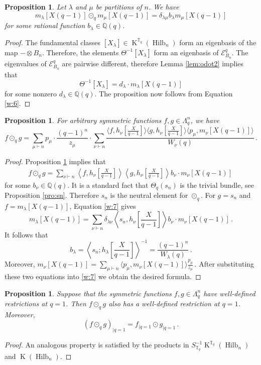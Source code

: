 \documentclass[12pt,a4paper]{amsart}
\theoremstyle{plain}
\newtheorem{pro}[tw]{Proposition}
\theoremstyle{definition}
\theoremstyle{remark}
\newcommand{\Hilb}[1]{\operatorname{Hilb}_{{#1}}}
\newcommand{\QQ}{\mathbb{Q}}
\newcommand{\Tq}{{\mathbb{T}_q}}
\newcommand{\E}{\mathcal{E}}
\DeclareMathOperator{\KTh}{K}
\begin{document}
\begin{pro} \label{pro:odot2}
	Let $\lambda$ and $\mu$ be partitions of $n$. We have
	$$
	m_\lambda[X(q-1)]\odot_q m_\mu[X(q-1)]=\delta_{\lambda\mu}b_\lambda m_\mu[X(q-1)]
	$$
	for some rational function $b_\lambda \in \QQ(q)$.
\end{pro}
\begin{proof}
	The fundamental classes $[X_\lambda]\in \KTh^\Tq(\Hilb{n})$ form an eigenbasis of the map \hbox{$-\otimes B_n$.} Therefore, the elements $\Theta^{-1}[X_\lambda]$ form an eigenbasis of $\E^q_{B_n}$. The eigenvalues of $\E^q_{B_n}$ are pairwise different, therefore Lemma \ref{lem:odot2} implies that
	$$\Theta^{-1}[X_\lambda]=d_\lambda\cdot m_\lambda[X(q-1)]$$
	for some nonzero $d_\lambda \in \QQ(q)$. The proposition now follows from Equation \eqref{w:6}.
\end{proof}

\begin{pro} \label{pro:odot3}
	For arbitrary symmetric functions $f,g\in\Lambda_q^n$, we have
	$$
		f\odot_q g
		=
		\sum_{\mu\vdash n}p_\mu\cdot\frac{(q-1)^n}{z_\mu}\cdot\sum_{\nu\vdash n}
		\frac{\langle f,h_\nu[\frac{X}{q-1}]\rangle\langle g,h_\nu[\frac{X}{q-1}]\rangle\langle p_\mu,m_\nu[X(q-1)]\rangle}{W_\nu(q)} 
		\,.
	$$
\end{pro}
\begin{proof}
	Proposition \ref{pro:odot2} implies that
	\begin{align} \label{w:7}
		f\odot_q g=\sum_{\nu\vdash n}
		\left\langle f, h_\nu\left[\frac{X}{q-1}\right]\right\rangle
		\left\langle g, h_\nu\left[\frac{X}{q-1}\right]\right\rangle
		b_\nu \cdot m_\nu[X(q-1)]\,
	\end{align}
	for some $b_\nu \in \QQ(q)$. 
	It is a standard fact that $\Theta_q(s_n)$ is the trivial bundle, see Proposition \ref{pro:sn}. 
	Therefore $s_n$ is the neutral element for $\odot_q$. For $g=s_n$ and $f=m_\lambda[X(q-1)]$, Equation \eqref{w:7} gives
	$$m_\lambda[X(q-1)]=
	\sum_{\nu\vdash n}
	\delta_{\lambda\nu}
	\left\langle s_n, h_\nu\left[\frac{X}{q-1}\right]\right\rangle
	b_\nu \cdot m_\nu[X(q-1)]\,.
	$$
	It follows that $$b_\lambda=\left\langle s_n; h_\lambda\left[\frac{X}{q-1}\right]\right\rangle^{-1}=\frac{(q-1)^n}{W_\lambda(q)}\,.$$
	Moreover, $m_\nu[X(q-1)]=\sum_{\mu\vdash n} \langle p_\mu,m_\nu[X(q-1)]\rangle \frac{p_\mu}{z_\mu}\,. $ After substituting these two equations into \eqref{w:7} we obtain the desired formula.
\end{proof}

\begin{pro} \label{pro:odot1}
	Suppose that the symmetric functions $f, g\in \Lambda_q^n$ have well-defined restrictions at $q=1$. Then $f \odot_q g$ also has a well-defined restriction at $q=1$. Moreover,
	$$ (f \odot_q g)_{|q=1}=f_{|q=1} \odot g_{|q=1}\,.$$
\end{pro}
\begin{proof}
	An analogous property is satisfied by the products in $S_\Tq^{-1}\KTh^\Tq(\Hilb{n})$ and $\KTh(\Hilb{n})$.
\end{proof}
\end{document}
